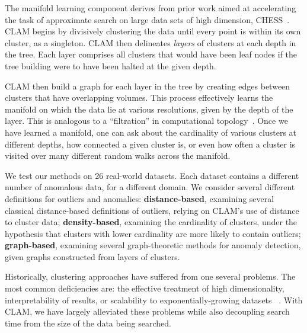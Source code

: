 The manifold learning component derives from prior work aimed at accelerating the task of approximate search on large data sets of high dimension, CHESS~\cite{ishaq2019entropy}. CLAM begins by divisively clustering the data until every point is within its own cluster, as a singleton.
CLAM then delineates \textit{layers} of clusters at each depth in the tree.
Each layer comprises all clusters that would have been leaf nodes if the tree building were to have been halted at the given depth.

CLAM then build a graph for each layer in the tree by creating edges between clusters that have overlapping volumes.
This process effectively learns the manifold on which the data lie at various resolutions, given by the depth of the layer. This is analogous to a ``filtration'' in computational topology~\cite{carlsson2009topology}.
Once we have learned a manifold, one can ask about the cardinality of various clusters at different depths, how connected a given cluster is, or even how often a cluster is visited over many different random walks across the manifold.

We test our methods on 26 real-world datasets. 
Each dataset contains a different number of anomalous data, for a different domain.
We consider several different definitions for outliers and anomalies: \textbf{distance-based}, examining several classical distance-based definitions of outliers, relying on CLAM's use of distance to cluster data; \textbf{density-based}, examining the cardinality of clusters, under the hypothesis that clusters with lower cardinality are more likely to contain outliers; \textbf{graph-based}, examining several graph-theoretic methods for anomaly detection, given graphs constructed from layers of clusters.

Historically, clustering approaches have suffered from one several problems.
The most common deficiencies are: the effective treatment of high dimensionality, interpretability of results, or scalability to exponentially-growing datasets ~\cite{rakesh_agrawal_automatic_1998}.
With CLAM, we have largely alleviated these problems while also decoupling search time from the size of the data being searched.
